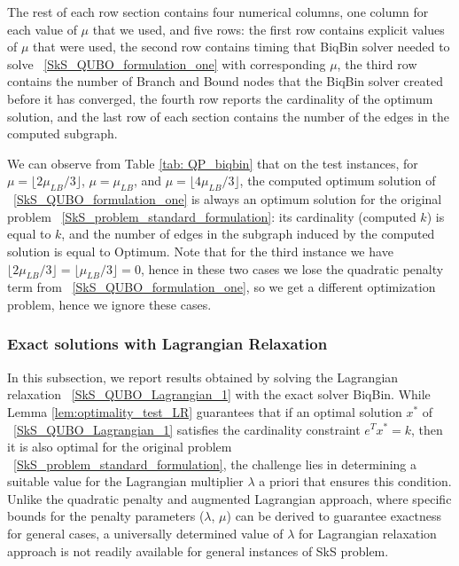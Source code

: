 \documentclass{article}
\begin{document}
The rest of each row section contains  four numerical columns, one column for each value of $\mu$ that we used, and  five rows:
the first row contains explicit values of $\mu$ that were used, the second row contains timing that BiqBin solver needed to solve ~\eqref{SkS_QUBO_formulation_one} with corresponding $\mu$, the third row contains the number of Branch and Bound nodes that the BiqBin solver created before it has converged, the fourth row reports the cardinality of the optimum solution, and the last row of each section contains the number of the edges in the computed subgraph.

We can observe from Table \ref{tab: QP_biqbin} that on the test instances, for $\mu=\lfloor 2\mu_{LB}/3 \rfloor$, $\mu=\mu_{LB}$, and $\mu = \lfloor 4\mu_{LB}/3 \rfloor$, the computed optimum solution of ~\eqref{SkS_QUBO_formulation_one}
is always an optimum solution for the original problem ~\eqref{SkS_problem_standard_formulation}: its cardinality (computed $k$) is equal to $k$, and   the number of edges in the subgraph induced by the computed solution is equal to Optimum.
Note that for the third instance we have   $ \lfloor 2\mu_{LB}/3 \rfloor=
\lfloor \mu_{LB}/3 \rfloor=0$, hence in these two cases we lose the quadratic penalty term from ~\eqref{SkS_QUBO_formulation_one}, so we get a different optimization problem, hence we ignore these cases.  

\subsubsection{Exact solutions with Lagrangian Relaxation}
In this subsection,  we report results obtained by solving the  Lagrangian relaxation ~\eqref{SkS_QUBO_Lagrangian_1} with the exact solver BiqBin. 
While Lemma \ref{lem:optimality_test_LR} guarantees that if an optimal solution $x^*$ of ~\eqref{SkS_QUBO_Lagrangian_1} satisfies the cardinality constraint $e^T x^* = k$, then it is also optimal for the original problem ~\eqref{SkS_problem_standard_formulation}, the challenge lies in determining a suitable value for the Lagrangian multiplier $\lambda$ a priori that ensures this condition. Unlike the quadratic penalty and augmented Lagrangian approach, where specific bounds for the penalty parameters ($\lambda$, $\mu$) can be derived to guarantee exactness for general cases, a universally determined value of $\lambda$ for Lagrangian relaxation approach is not readily available for general instances of  SkS problem.
\end{document}
